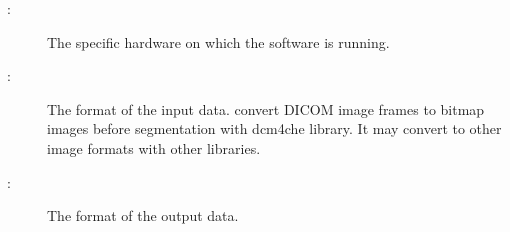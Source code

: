 \documentclass[12pt, titlepage]{article}
\begin{document}
\begin{description}
\item[ \actheacnum \label{acHardware}:] The specific
hardware on which the software is running.

\item[ \actheacnum \label{acInput}:] The format of the
  input data.
\progname{}
convert DICOM image frames to bitmap images before segmentation with dcm4che
library. It may convert to other image formats with other libraries.

\item[ \actheacnum \label{acOutput}:] The format of the
output data.


\end{description}
\end{document}
